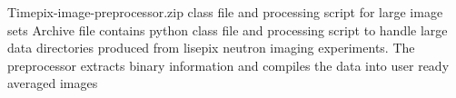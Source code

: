 \documentclass[../main.tex]{subfiles}%
\begin{document}
%
    \Xsupplement%
    \begin{supplement}%
        \supplementcaption%
            {Timepix-image-preprocessor.zip}%
            { class file and processing script for large image sets}%
            {Archive file contains \gls{python} class file and processing script to handle large data directories produced from \gls{lisepix} neutron imaging experiments.
            The preprocessor extracts binary information and compiles the data into user ready averaged images}%
        \label{sup:timepix-image-preprocessor}%
    \end{supplement}%
\end{document}
